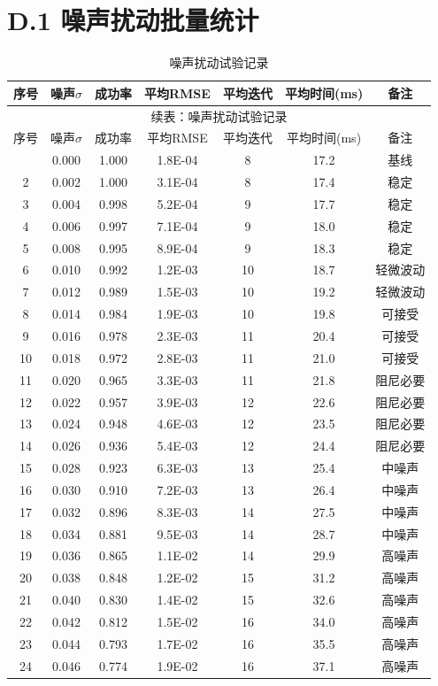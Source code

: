 \section*{D.1 噪声扰动批量统计}
{
\footnotesize
\begin{longtable}{ccccccc}
\caption{噪声扰动试验记录}\\
\toprule
序号 & 噪声$\sigma$ & 成功率 & 平均RMSE & 平均迭代 & 平均时间(ms) & 备注\\
\midrule
\endfirsthead
\multicolumn{7}{c}{续表：噪声扰动试验记录}\\
\toprule
序号 & 噪声$\sigma$ & 成功率 & 平均RMSE & 平均迭代 & 平均时间(ms) & 备注\\
\midrule
\endhead
\bottomrule
\endfoot
1&0.000&1.000&1.8E-04&8&17.2&基线\\
2&0.002&1.000&3.1E-04&8&17.4&稳定\\
3&0.004&0.998&5.2E-04&9&17.7&稳定\\
4&0.006&0.997&7.1E-04&9&18.0&稳定\\
5&0.008&0.995&8.9E-04&9&18.3&稳定\\
6&0.010&0.992&1.2E-03&10&18.7&轻微波动\\
7&0.012&0.989&1.5E-03&10&19.2&轻微波动\\
8&0.014&0.984&1.9E-03&10&19.8&可接受\\
9&0.016&0.978&2.3E-03&11&20.4&可接受\\
10&0.018&0.972&2.8E-03&11&21.0&可接受\\
11&0.020&0.965&3.3E-03&11&21.8&阻尼必要\\
12&0.022&0.957&3.9E-03&12&22.6&阻尼必要\\
13&0.024&0.948&4.6E-03&12&23.5&阻尼必要\\
14&0.026&0.936&5.4E-03&12&24.4&阻尼必要\\
15&0.028&0.923&6.3E-03&13&25.4&中噪声\\
16&0.030&0.910&7.2E-03&13&26.4&中噪声\\
17&0.032&0.896&8.3E-03&14&27.5&中噪声\\
18&0.034&0.881&9.5E-03&14&28.7&中噪声\\
19&0.036&0.865&1.1E-02&14&29.9&高噪声\\
20&0.038&0.848&1.2E-02&15&31.2&高噪声\\
21&0.040&0.830&1.4E-02&15&32.6&高噪声\\
22&0.042&0.812&1.5E-02&16&34.0&高噪声\\
23&0.044&0.793&1.7E-02&16&35.5&高噪声\\
24&0.046&0.774&1.9E-02&16&37.1&高噪声\\

\end{longtable}}
